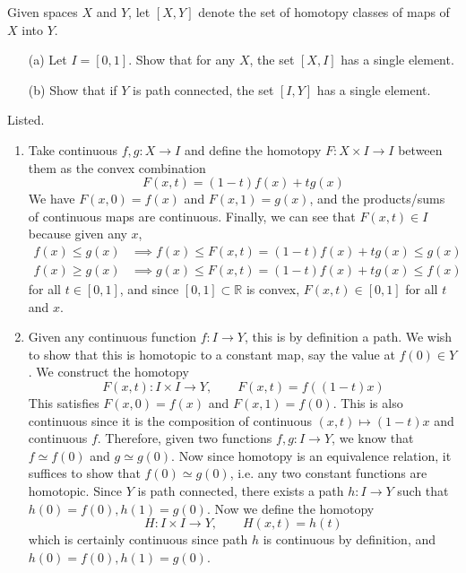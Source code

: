   \begin{exercise}[Munkres 51.2]
    Given spaces $X$ and $Y$, let $[X, Y]$ denote the set of homotopy classes of maps of $X$ into $Y$.
    \begin{enumerate}
      \item[(a)] Let $I = [0, 1]$. Show that for any $X$, the set $[X, I]$ has a single element.
      \item[(b)] Show that if $Y$ is path connected, the set $[I, Y]$ has a single element.
    \end{enumerate}
  \end{exercise}
  \begin{solution}
    Listed. 
    \begin{enumerate}
      \item Take continuous $f, g: X \rightarrow I$ and define the homotopy $F: X \times I \rightarrow I$ between them as the convex combination 
      \begin{equation}
        F(x, t) = (1 - t) f(x) + t g(x)
      \end{equation}
      We have $F(x, 0) = f(x)$ and $F(x, 1) = g(x)$, and the products/sums of continuous maps are continuous. Finally, we can see that $F(x, t) \in I$ because given any $x$, 
      \begin{align}
        f(x) \leq g(x) & \implies f(x) \leq F(x, t) = (1 - t) f(x) + t g(x) \leq g(x) \\
        f(x) \geq g(x) & \implies g(x) \leq F(x, t) = (1 - t) f(x) + t g(x) \leq f(x)
      \end{align} 
      for all $t \in [0, 1]$, and since $[0, 1] \subset \mathbb{R}$ is convex, $F(x, t) \in [0, 1]$ for all $t$ and $x$. 

      \item Given any continuous function $f: I \rightarrow Y$, this is by definition a path. We wish to show that this is homotopic to a constant map, say the value at $f(0) \in Y$. We construct the homotopy 
      \begin{equation}
        F(x, t): I \times I \rightarrow Y, \qquad F(x, t) = f((1 - t) x)
      \end{equation}
      This satisfies $F(x, 0) = f(x)$ and $F(x, 1) = f(0)$. This is also continuous since it is the composition of continuous $(x, t) \mapsto (1 - t)x$ and continuous $f$. Therefore, given two functions $f, g: I \rightarrow Y$, we know that $f \simeq f(0)$ and $g \simeq g(0)$. Now since homotopy is an equivalence relation, it suffices to show that $f(0) \simeq g(0)$, i.e. any two constant functions are homotopic. Since $Y$ is path connected, there exists a path $h: I \rightarrow Y$ such that $h(0) = f(0), h(1) = g(0)$. Now we define the homotopy 
      \begin{equation}
        H: I \times I \rightarrow Y, \qquad H(x, t) = h(t)
      \end{equation}
      which is certainly continuous since path $h$ is continuous by definition, and $h(0) = f(0), h(1) = g(0)$. 
    \end{enumerate}
  \end{solution}

